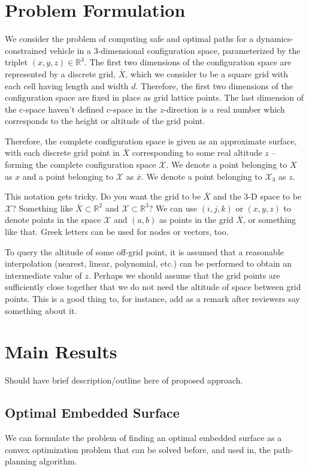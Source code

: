 \documentclass[letterpaper, 12pt]{article}
\def\startmodif{\color{blue}}
\def\stopmodif{\color{black}\normalcolor}
\newcommand{\dac}[1]{\color{red}#1}
\begin{document}
\section{\startmodif Problem Formulation \stopmodif}
\startmodif We consider the problem of computing safe and optimal paths for a dynamics-constrained vehicle in a 3-dimensional configuration space, parameterized by the triplet $(x,y,z)\in\mathbb{R}^3$. \stopmodif The first two dimensions of the configuration space are represented by a discrete grid, $\bar{X}$, which \startmodif we consider to be a square \stopmodif grid with each cell having length and width $d$. Therefore, the first two dimensions of the configuration space are fixed in place as grid lattice points. The last dimension of the c-space {\dac haven't defined c-space} in the $z$-direction is a real number which corresponds to the height or altitude of the grid point.

Therefore, the complete configuration space is given as an approximate surface, with each discrete grid point in \startmodif $\bar X$ \stopmodif corresponding to some real altitude $z$ -- forming the complete configuration space $\mathcal{X}$. We denote a point belonging to $X$ as $x$ and a point belonging to $\mathcal{X}$ as $\bar{x}$. We denote a point belonging to $\mathcal{X}_3$ as $z$.

{\dac This notation gets tricky. Do you want the grid to be $\bar X$ and the 3-D space to be $\mathcal{X}$? Something like $\bar X\subset \mathbb{R}^2$ and $\mathcal X \subset\mathbb{R}^3$? We can use $(i,j,k)$ or $(x,y,z)$ to denote points in the space $\mathcal X$ and $(a,b)$ as points in the grid $\bar X$, or something like that. Greek letters can be used for nodes or vectors, too.}

To query the altitude of some off-grid point, it is assumed that a reasonable interpolation (nearest, linear, polynomial, etc.) can be performed to obtain an intermediate value of $z$.
{\dac Perhaps we should assume that the grid points are sufficiently close together that we do not need the altitude of space between grid points. This is a good thing to, for instance, add as a remark after reviewers say something about it.}

\startmodif
\section{Main Results}
{\dac Should have brief description/outline here of proposed approach.}

\subsection{Optimal Embedded Surface}
We can formulate the problem of finding an optimal embedded surface as a convex optimization problem that can be solved before, and used in, the path-planning algorithm.
\end{document}
